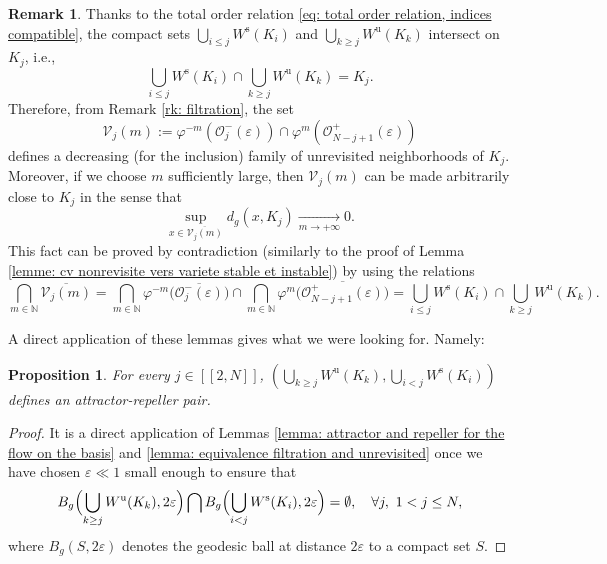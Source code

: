 \documentclass[11pt]{article}
\newcommand{\ie}{i.e.,\xspace}
\newcommand{\lcr}{[\![}
\newcommand{\rcr}{]\!]}
\newcommand{\rs}{\mathrm{s}}
\newcommand{\ru}{\mathrm{u}}
\theoremstyle{definition}
\newtheorem{remark}[definition]{Remark}
\theoremstyle{plain}
\newtheorem{prop}[definition]{Proposition}
\newcommand{\N}{\mathbb{N}}
\newcommand{\Ocal}{\mathcal{O}}
\newcommand{\Vcal}{\mathcal{V}}
\begin{document}
\begin{remark}\label{rk: epsilon neighborhood proof below filtration}
Thanks to the total order relation \eqref{eq: total order relation, indices compatible}, the compact sets $\bigcup_{i \leq j} W^\rs (K_i)$ and $\bigcup_{k \geq j}W^\ru (K_k)$ intersect on $K_j$, \ie
\begin{equation}\label{eq: remark epsilon unrevisited neighborhoods}
\bigcup_{i \leq j}W^\rs (K_i) \cap \bigcup_{k \geq j}W^\ru (K_k) = K_j.
\end{equation}
Therefore, from Remark \ref{rk: filtration}, the set
\[
\Vcal_{j} (m):= \varphi^{-m}\left(\Ocal_j^- (\varepsilon) \right)\cap \varphi^m \left(\Ocal_{N-j+1}^+ (\varepsilon)\right)
\]
defines a decreasing (for the inclusion) family of unrevisited neighborhoods of $K_j$. Moreover, if we choose $m$ sufficiently large, then $\Vcal_j (m)$ can be made arbitrarily close to $K_j$ in the sense that
\[
\sup_{x \in \overline{\Vcal_{j} (m)}} d_g \left(x, K_j \right) \underset{m \to +\infty}{\to} 0.
\]
This fact can be proved by contradiction (similarly to the proof of Lemma \ref{lemme: cv nonrevisite vers variete stable et instable}) by using the relations
\[
\bigcap_{m \in \N} \overline{\Vcal_{j} (m)} = \bigcap_{m \in \N} \varphi^{-m}\bigl(\overline{\Ocal_j^- (\varepsilon)} \bigr) \cap \bigcap_{m \in \N} \varphi^m \bigl(\overline{\Ocal_{N-j+1}^+ (\varepsilon)}\bigr) = \bigcup_{i \leq j}W^\rs (K_i) \cap \bigcup_{k \geq j}W^\ru (K_k).
\]
\end{remark}

A direct application of these lemmas gives what we were looking for. Namely:

\begin{prop}\label{prop: attractor reppeler couple on the base}
For every $j\in\lcr2,N\rcr$, $(\bigcup_{k \geq j} W^\ru (K_k), \bigcup_{i < j}W^\rs (K_i))$ defines an attractor-repeller pair.
\end{prop}

\begin{proof}It is a direct application of Lemmas \ref{lemma: attractor and repeller for the flow on the basis} and \ref{lemma: equivalence filtration and unrevisited} once we have chosen $\varepsilon\ll 1$ small enough to ensure that
\[
B_g \Bigl(\bigcup_{k \geq j} W^\ru (K_k), 2\varepsilon \Bigr) \bigcap B_g \Bigl(\bigcup_{i < j} W^\rs (K_i), 2\varepsilon \Bigr) = \emptyset, \quad \forall j,\ 1 < j \leq N,
\]
where $B_g(S, 2\varepsilon)$ denotes the geodesic ball at distance $2\varepsilon$ to a compact set $S$.
\end{proof}
\end{document}
